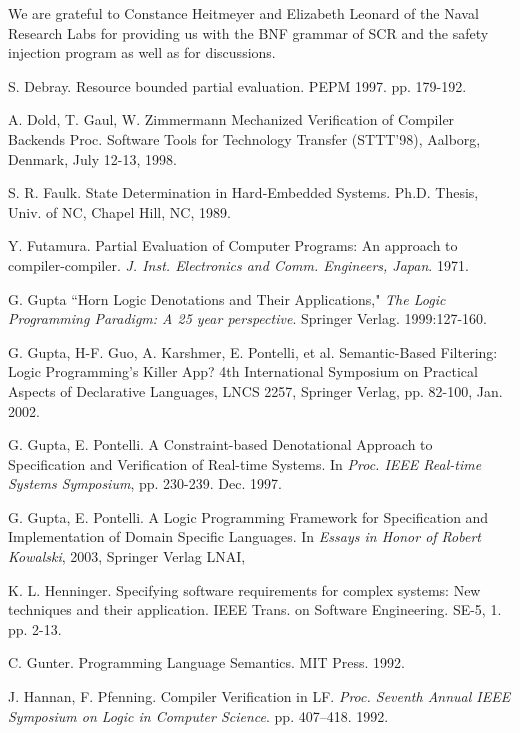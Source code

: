 \documentclass{entcs}
\begin{document}
\begin{ack}
We are grateful to Constance Heitmeyer and Elizabeth Leonard of the
Naval Research Labs for providing us with the BNF grammar of SCR and
the safety injection program as well as for discussions. 
\end{ack}


\begin{thebibliography}{10}\label{bibliography}
S. Debray. Resource bounded partial evaluation. PEPM 1997. pp. 179-192.

A. Dold, T. Gaul, W. Zimmermann 
Mechanized Verification of Compiler Backends 
Proc. Software Tools for Technology Transfer (STTT'98), 
Aalborg, Denmark, July 12-13, 1998.

S. R. Faulk. State Determination in Hard-Embedded Systems. Ph.D. 
Thesis, Univ. of NC, Chapel Hill, NC, 1989.

 Y. Futamura. Partial Evaluation of
 Computer Programs: An approach to compiler-compiler.
{\it J. Inst. Electronics and Comm. Engineers, Japan}.
1971.                           

G. Gupta  ``Horn Logic Denotations and Their Applications,"
{\it The Logic Programming Paradigm: A 25 year perspective}.
Springer Verlag.  1999:127-160.                              

G. Gupta, H-F. Guo, A. Karshmer, E. Pontelli, et al.
Semantic-Based Filtering: Logic  Programming's Killer App?
4th International Symposium on Practical Aspects of Declarative
Languages, LNCS 2257, Springer Verlag, pp. 82-100, Jan. 2002.


G. Gupta, E. Pontelli. A Constraint-based Denotational Approach to
        Specification and Verification of Real-time Systems.
        In {\it Proc. IEEE Real-time Systems Symposium}, 
	pp. 230-239. Dec. 1997.

 G. Gupta, E. Pontelli. 
	A Logic Programming Framework for Specification
	and Implementation of Domain Specific Languages.
	In {\it Essays in Honor of Robert Kowalski}, 2003,
	Springer Verlag LNAI,

 K. L. Henninger. Specifying software requirements for complex
	systems: New techniques and their application. IEEE Trans.
	on Software Engineering. SE-5, 1. pp. 2-13.

C. Gunter. Programming Language Semantics. MIT Press. 1992.

J. Hannan, F. Pfenning.
        Compiler Verification in {LF}.
	{\it Proc. Seventh Annual {IEEE} Symposium 
	on Logic in Computer Science}.
	pp. 407--418. 1992.


\end{thebibliography}
\end{document}
